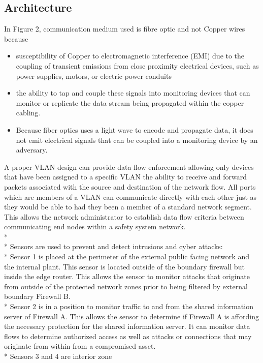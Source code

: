 \documentclass{article}
\begin{document}
\subsection{Architecture}
In Figure 2, communication medium used is fibre optic and not Copper wires because
\begin{itemize}
    \item susceptibility of Copper to electromagnetic interference (EMI) due to the coupling of transient
emissions from close proximity electrical devices, such as power supplies, motors, or
electric power conduits
\item the ability to tap and couple these signals into monitoring devices that can monitor or
replicate the data stream being propagated within the copper cabling.
\item Because fiber
optics uses a light wave to encode and propagate data, it does not emit electrical signals that can
be coupled into a monitoring device by an adversary.
\end{itemize}
A proper VLAN design can provide data flow enforcement allowing only devices that have been
assigned to a specific VLAN the ability to receive and forward packets associated with the
source and destination of the network flow. All ports which are members of a VLAN can
communicate directly with each other just as they would be able to had they been a member of a
standard network segment. This allows the network administrator to establish data flow criteria
between communicating end nodes within a safety system network.
\\*
\\*
Sensors are used to prevent and detect intrusions and cyber attacks:
\\*
Sensor 1 is placed at the perimeter of the external public facing network and
the internal plant. This sensor is located outside of the boundary firewall but inside the edge
router. This allows the sensor to monitor attacks that originate from outside of the protected
network zones prior to being filtered by external boundary Firewall B. \\* Sensor 2 is in a position to
monitor traffic to and from the shared information server of Firewall A. This allows the sensor to
determine if Firewall A is affording the necessary protection for the shared information server. It
can monitor data flows to determine authorized access as well as attacks or connections that may
originate from within from a compromised asset. \\* Sensors 3 and 4 are interior zone
\end{document}
